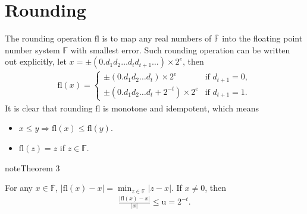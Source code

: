 \documentclass[letterpaper,10pt,english]{jupyterBook}
\begin{document}
\section{Rounding}
\label{\detokenize{floating_point:rounding}}
\sphinxAtStartPar
The rounding operation \(\textrm{fl}\) is to map any real numbers of \(\overline{\mathbb{F}}\) into the floating point number system \(\mathbb{F}\) with smallest error. Such rounding operation can be written out explicitly, let \(x = \pm (0.d_1 d_2\dots d_t d_{t+1}\dots )\times 2^e\), then
\begin{equation*}
\begin{split}
    \textrm{fl}(x) =\begin{cases}
        \pm (0.d_1 d_2\dots d_t) \times 2^e & \text{if } d_{t+1} = 0,\\
        \pm (0.d_1 d_2\dots d_t  + 2^{-t}) \times 2^e & \text{if } d_{t+1} = 1.
    \end{cases}
\end{split}
\end{equation*}
\sphinxAtStartPar
It is clear that rounding \(\textrm{fl}\) is monotone and idempotent, which means
\begin{itemize}
\item {} 
\sphinxAtStartPar
\(x\le y \Rightarrow \textrm{fl}(x) \le \textrm{fl}(y)\).

\item {} 
\sphinxAtStartPar
\(\textrm{fl}(z) = z\) if \(z\in \mathbb{F}\).

\end{itemize}
\label{floating_point:THM-REL-ERR}
\begin{sphinxadmonition}{note}{Theorem 3}



\sphinxAtStartPar
For any \(x\in \overline{\mathbb{F}}\), \(|\textrm{fl}(x) - x| = \min_{z\in \mathbb{F}} |z - x|\). If \(x\neq 0\), then
\begin{equation*}
\begin{split}\frac{|\textrm{fl}(x) - x|}{|x|}\le \mathrm{u} = 2^{-t}.\end{split}
\end{equation*}\end{sphinxadmonition}
\end{document}
